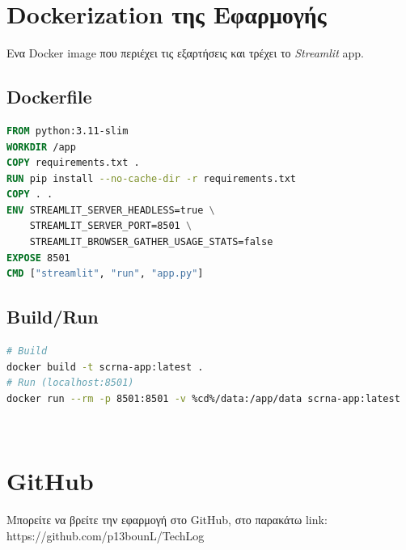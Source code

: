 \documentclass[12pt,a4paper]{article}
\begin{document}
\section{Dockerization της Εφαρμογής}
Ενα Docker image που περιέχει τις εξαρτήσεις και τρέχει το \textit{Streamlit} app.
\subsection*{Dockerfile}
\begin{lstlisting}[language=Dockerfile]
FROM python:3.11-slim
WORKDIR /app
COPY requirements.txt .
RUN pip install --no-cache-dir -r requirements.txt
COPY . .
ENV STREAMLIT_SERVER_HEADLESS=true \
    STREAMLIT_SERVER_PORT=8501 \
    STREAMLIT_BROWSER_GATHER_USAGE_STATS=false
EXPOSE 8501
CMD ["streamlit", "run", "app.py"]
\end{lstlisting}
\subsection*{Build/Run}
\begin{lstlisting}[language=bash]
# Build
docker build -t scrna-app:latest .
# Run (localhost:8501)
docker run --rm -p 8501:8501 -v %cd%/data:/app/data scrna-app:latest
\end{lstlisting}

\\\section{GitHub}
Μπορείτε να βρείτε την εφαρμογή στο GitHub, στο παρακάτω link:
\\https://github.com/p13bounL/TechLog
\end{document}
